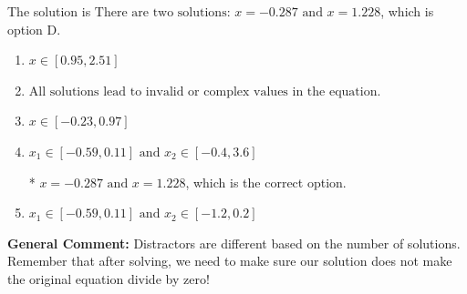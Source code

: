 \documentclass{extbook}[14pt]
\begin{document}
\begin{enumerate}
{The solution is \( \text{There are two solutions: } x = -0.287 \text{ and } x = 1.228 \), which is option D.\begin{enumerate}[label=\Alph*.]
\item \( x \in [0.95,2.51] \)


\item \( \text{All solutions lead to invalid or complex values in the equation.} \)


\item \( x \in [-0.23,0.97] \)


\item \( x_1 \in [-0.59, 0.11] \text{ and } x_2 \in [-0.4,3.6] \)

* $x = -0.287 \text{ and } x = 1.228$, which is the correct option.
\item \( x_1 \in [-0.59, 0.11] \text{ and } x_2 \in [-1.2,0.2] \)


\end{enumerate}

\textbf{General Comment:} Distractors are different based on the number of solutions. Remember that after solving, we need to make sure our solution does not make the original equation divide by zero!
}
\end{enumerate}
\end{document}
